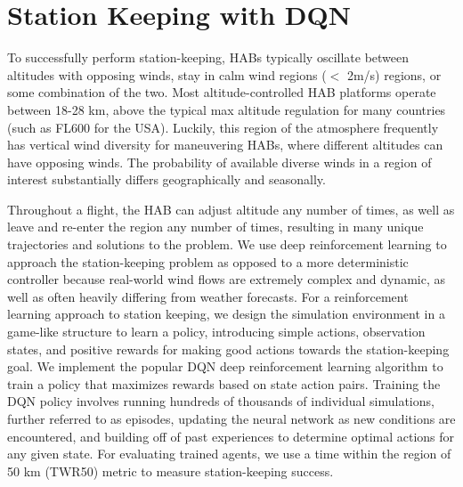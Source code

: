 \section{Station Keeping with DQN}\label{section:SimEnvforDQN}

To successfully perform station-keeping, HABs typically oscillate between altitudes with opposing winds, stay in calm wind regions ($<$ 2m/s) regions, or some combination of the two. Most altitude-controlled HAB platforms operate between 18-28 km, above the typical max altitude regulation for many countries (such as FL600 for the USA).  Luckily, this region of the atmosphere frequently has vertical wind diversity for maneuvering HABs, where different altitudes can have opposing winds. The probability of available diverse winds in a region of interest substantially differs geographically and seasonally. 

Throughout a flight, the HAB can adjust altitude any number of times, as well as leave and re-enter the region any number of times, resulting in many unique trajectories and solutions to the problem. We use deep reinforcement learning to approach the station-keeping problem as opposed to a more deterministic controller because real-world wind flows are extremely complex and dynamic, as well as often heavily differing from weather forecasts.  For a reinforcement learning approach to station keeping, we design the simulation environment in a game-like structure to learn a policy, introducing simple actions, observation states, and positive rewards for making good actions towards the station-keeping goal.  We implement the popular DQN deep reinforcement learning algorithm to train a policy that maximizes rewards based on state action pairs. Training the DQN policy involves running hundreds of thousands of individual simulations, further referred to as episodes, updating the neural network as new conditions are encountered, and building off of past experiences to determine optimal actions for any given state. For evaluating trained agents, we use a time within the region of 50 km (TWR50) metric to measure station-keeping success.


